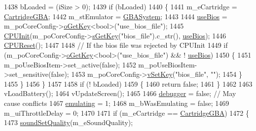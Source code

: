 \begin{DoxyCode}
{1438     bLoaded = (iSize > 0);
1439     \textcolor{keywordflow}{if} (bLoaded)
1440     \{
1441       m\_eCartridge = \mbox{\hyperlink{class_v_b_a_1_1_window_af580451d3ee7a738a73434858a08fa65a64f96d20685b8bd757b1996f9d0cd906}{CartridgeGBA}};
1442       m\_stEmulator = \mbox{\hyperlink{_g_b_a_8cpp_a5affbb231a41d8d07f6e8dc9ef59789e}{GBASystem}};
1443 
1444       \mbox{\hyperlink{gb_globals_8h_ac2e7c0a19c3be95f9226870ca6875c8b}{useBios}} = m\_poCoreConfig->\mbox{\hyperlink{class_v_b_a_1_1_config_1_1_section_ab169d7aae4e9dde91418ba1668e3ad39}{oGetKey}}<\textcolor{keywordtype}{bool}>(\textcolor{stringliteral}{"use\_bios\_file"});
1445       \mbox{\hyperlink{_g_b_a_8cpp_a19d66b06024f86a38f4df435e5b975fc}{CPUInit}}(m\_poCoreConfig->\mbox{\hyperlink{class_v_b_a_1_1_config_1_1_section_a7ac9dfabf38bc1db83a6017e130f04ac}{sGetKey}}(\textcolor{stringliteral}{"bios\_file"}).c\_str(), 
      \mbox{\hyperlink{gb_globals_8h_ac2e7c0a19c3be95f9226870ca6875c8b}{useBios}});
1446       \mbox{\hyperlink{_g_b_a_8cpp_a0e28c45345553e3693144745c12aff9b}{CPUReset}}();
1447 
1448       \textcolor{comment}{// If the bios file was rejected by CPUInit}
1449       \textcolor{keywordflow}{if} (m\_poCoreConfig->\mbox{\hyperlink{class_v_b_a_1_1_config_1_1_section_ab169d7aae4e9dde91418ba1668e3ad39}{oGetKey}}<\textcolor{keywordtype}{bool}>(\textcolor{stringliteral}{"use\_bios\_file"}) && ! \mbox{\hyperlink{gb_globals_8h_ac2e7c0a19c3be95f9226870ca6875c8b}{useBios}})
1450       \{
1451         m\_poUseBiosItem->set\_active(\textcolor{keyword}{false});
1452         m\_poUseBiosItem->set\_sensitive(\textcolor{keyword}{false});
1453         m\_poCoreConfig->\mbox{\hyperlink{class_v_b_a_1_1_config_1_1_section_a57e1b95cbea40db71c093381beff4b0e}{vSetKey}}(\textcolor{stringliteral}{"bios\_file"}, \textcolor{stringliteral}{""});
1454       \}
1455     \}
1456   \}
1457 
1458   \textcolor{keywordflow}{if} (! bLoaded)
1459   \{
1460     \textcolor{keywordflow}{return} \textcolor{keyword}{false};
1461   \}
1462 
1463   vLoadBattery();
1464   vUpdateScreen();
1465 
1466   \mbox{\hyperlink{window_8cpp_af67e2df4c66ef114f4edb85c06810007}{debugger}} = \textcolor{keyword}{false}; \textcolor{comment}{// May cause conflicts}
1467   \mbox{\hyperlink{gb_globals_8h_af9cc36078b1b311753963297ae7f2a74}{emulating}} = 1;
1468   m\_bWasEmulating = \textcolor{keyword}{false};
1469   m\_uiThrottleDelay = 0;
1470 
1471   \textcolor{keywordflow}{if} (m\_eCartridge == \mbox{\hyperlink{class_v_b_a_1_1_window_af580451d3ee7a738a73434858a08fa65a64f96d20685b8bd757b1996f9d0cd906}{CartridgeGBA}})
1472   \{
1473     \mbox{\hyperlink{_sound_8cpp_a46bef5048521e8000f3850e686e7eb22}{soundSetQuality}}(m\_eSoundQuality);
}
\end{DoxyCode}
